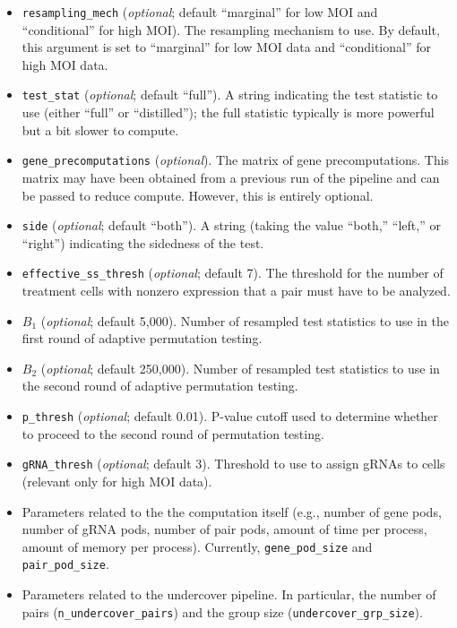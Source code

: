 \documentclass[12pt]{article}
\begin{document}
\begin{itemize}
\item \texttt{resampling\_mech} (\textit{optional}; default “marginal” for low MOI and “conditional” for high MOI). The resampling mechanism to use. By default, this argument is set to “marginal” for low MOI data and “conditional” for high MOI data.

\item \texttt{test\_stat} (\textit{optional}; default “full”). A string indicating the test statistic to use (either “full” or “distilled”); the full statistic typically is more powerful but a bit slower to compute.

\item \texttt{gene\_precomputations} (\textit{optional}). The matrix of gene precomputations. This matrix may have been obtained from a previous run of the pipeline and can be passed to reduce compute. However, this is entirely optional.  

\item \texttt{side} (\textit{optional}; default “both”). A string (taking the value “both,” “left,” or “right”) indicating the sidedness of the test.

\item \texttt{effective\_ss\_thresh} (\textit{optional}; default 7). The threshold for the number of treatment cells with nonzero expression that a pair must have to be analyzed.

\item $B_1$ (\textit{optional}; default 5,000). Number of resampled test statistics to use in the first round of adaptive permutation testing.

\item $B_2$ (\textit{optional}; default 250,000). Number of resampled test statistics to use in the second round of adaptive permutation testing. 

\item \texttt{p\_thresh} (\textit{optional}; default 0.01). P-value cutoff used to determine whether to proceed to the second round of permutation testing.

\item \texttt{gRNA\_thresh} (\textit{optional}; default 3). Threshold to use to assign gRNAs to cells (relevant only for high MOI data).

\item Parameters related to the the computation itself (e.g., number of gene pods, number of gRNA pods, number of pair pods, amount of time per process, amount of memory per process). Currently, \texttt{gene\_pod\_size} and \texttt{pair\_pod\_size}.

\item Parameters related to the undercover pipeline. In particular, the number of pairs (\texttt{n\_undercover\_pairs}) and the group size (\texttt{undercover\_grp\_size}).

\end{itemize}
\end{document}
